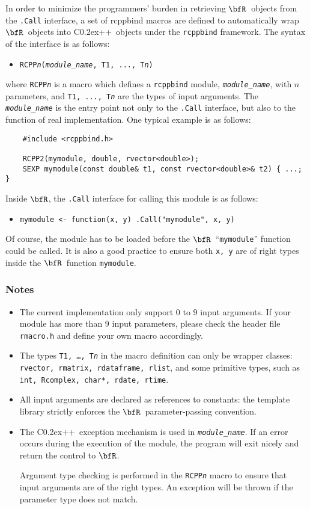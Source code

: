 \documentclass{article}
\def\C++{C{\raise 0.2ex\hbox{++}}}
\newcommand{\R}{$\bfR$}
\begin{document}
In order to minimize the programmers' burden in retrieving
\R\ objects from the \texttt{.Call} interface, a set of
rcppbind macros are defined to automatically wrap \R\ objects
into \C++\ objects under the \texttt{rcppbind} framework.
The syntax of the interface is as follows:
\begin{itemize}
  \item[] \texttt{RCPP\textsl{n}(\textsl{module\_name}, T1, ..., T\textsl{n})}
\end{itemize}
where \texttt{RCPP\textsl{n}} is a macro which defines a
\texttt{rcppbind} module, \texttt{\textsl{module\_name}},
with $n$ parameters, and \texttt{T1, ..., T\textsl{n}} are
the types of input arguments. The
\texttt{\textsl{module\_name}} is the entry point not only to the
\texttt{.Call} interface, but also to the function of real
implementation. One typical example is as follows:
\begin{lstlisting}
    #include <rcppbind.h>

    RCPP2(mymodule, double, rvector<double>);
    SEXP mymodule(const double& t1, const rvector<double>& t2) { ...; }
\end{lstlisting}
Inside \R, the \texttt{.Call} interface for calling this
module is as follows:
\begin{itemize}
  \item[] \texttt{mymodule <- function(x, y) .Call("mymodule", x, y)}
\end{itemize}
Of course, the module has to be loaded before the \R\
``\texttt{mymodule}'' function could be called. It is also a
good practice to ensure both \texttt{x, y} are of right types
inside the \R\ function \texttt{mymodule}.

\subsubsection*{Notes}
\begin{itemize}
  \item The current implementation only support 0 to 9 input
    arguments. If your module has more than 9 input
    parameters, please check the header file
    \texttt{rmacro.h} and define your own macro
    accordingly.
  \item The types \texttt{T1, \ldots, T\textsl{n}} in the
    macro definition can only be wrapper classes:
    \texttt{rvector, rmatrix, rdataframe, rlist}, and some
    primitive types, such as \texttt{int, Rcomplex, char*,
    rdate, rtime}.
  \item All input arguments are declared as references to
    constants: the template library strictly enforces the \R\
    parameter-passing convention.
  \item The \C++\ exception mechanism is used in
    \texttt{\textsl{module\_name}}. If an error occurs during
    the execution of the module, the program will exit nicely
    and return the control to \R.
  
    Argument type checking is performed in the
    \texttt{RCPP\textsl{n}} macro to ensure that input
    arguments are of the right types. An exception will be
    thrown if the parameter type does not match.
\end{itemize}
\end{document}
